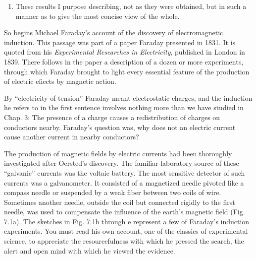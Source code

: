 {\begin{enumerate}
\item These results I purpose describing, not as they were obtained, but in
such a manner as to give the most concise view of the whole.

\end{enumerate}
}

So begins Michael Faraday's account of the discovery of electromagnetic
induction. This passage was part of a paper Faraday presented
in 1831. It is quoted from his \emph{Experimental Researches in
Electricity}, published in London in 1839. There follows in the paper
a description of a dozen or more experiments, through which Faraday
brought to light every essential feature of the production of electric
efiects by magnetic action.

By ``electricity of tension'' Faraday meant electrostatic charges,
and the induction he refers to in the first sentence involves nothing
more than we have studied in Chap. 3: The presence of a charge
causes a redistribution of charges on conductors nearby. Faraday's
question was, why does not an electric current cause another current
in nearby conductors?

The production of magnetic fields by electric currents had been
thoroughly investigated after Oersted's discovery. The familiar
laboratory source of these ``galvanic'' currents was the voltaic battery.
The most sensitive detector of such currents was a galvanometer. It
consisted of a magnetized needle pivoted like a compass needle or
suspended by a weak fiber between two coils of wire. Sometimes
another needle, outside the coil but connected rigidly to the first
needle, was used to compensate the influence of the earth's magnetic
field (Fig. 7.1a). The sketches in Fig. 7.1b through e represent a
few of Faraday's induction experiments. You must read his own
account, one of the classics of experimental science, to appreciate
the resourcefulness with which he pressed the search, the alert and
open mind with which he viewed the evidence.

